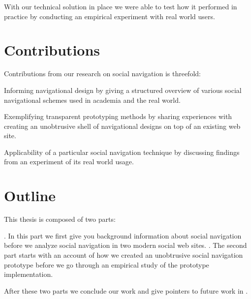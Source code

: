 With our technical solution in place we were able to test how it performed in
practice by conducting an empirical experiment with real world users.

\section{Contributions}

Contributions from our research on social navigation is threefold:

\begin{enum}
  \item Informing navigational design by giving a structured overview of
    various social navigational schemes used in academia and the real world.
  \item Exemplifying transparent prototyping methods by sharing experiences
    with creating an unobtrusive shell of navigational designs on top of an
    existing web site.
  \item Applicability of a particular social navigation technique
    by discussing findings from an experiment of its real world usage.
\end{enum}

\section{Outline}

This thesis is composed of two parts:

\begin{enum}
  . In this part we first give you
    background information about social navigation before
    we analyze social navigation in two modern social web sites.
  . The second part starts
    with an account of how we created an unobtrusive social navigation
    prototype before we go through an empirical study of the prototype
    implementation.
\end{enum}

After these two parts we conclude our work and give pointers to future work
in .
